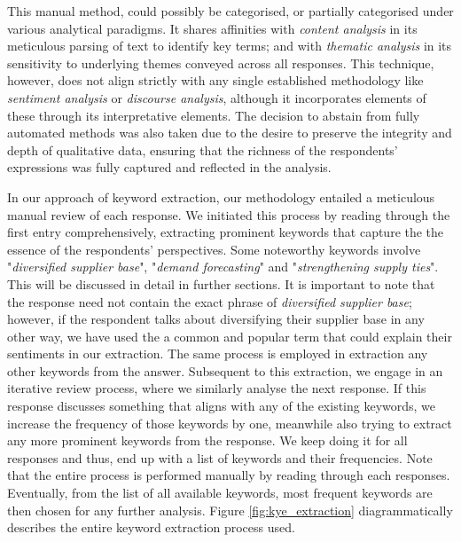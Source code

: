 This manual method, could possibly be categorised, or partially categorised under various analytical paradigms. It shares affinities with \textit{content analysis} in its meticulous parsing of text to identify key terms; and with \textit{thematic analysis} in its sensitivity to underlying themes conveyed across all responses. This technique, however, does not align strictly with any single established methodology like \textit{sentiment analysis} or \textit{discourse analysis}, although it incorporates elements of these through its interpretative elements. The decision to abstain from fully automated methods was also taken due to the desire to preserve the integrity and depth of qualitative data, ensuring that the richness of the respondents' expressions was fully captured and reflected in the analysis. 

In our approach of keyword extraction, our methodology entailed a meticulous manual review of each response. We initiated this process by reading through the first entry comprehensively, extracting prominent keywords that capture the the essence of the respondents' perspectives. Some noteworthy keywords involve "\textit{diversified supplier base}", "\textit{demand forecasting}" and "\textit{strengthening supply ties}". This will be discussed in detail in further sections. It is important to note that the response need not contain the exact phrase of \textit{diversified supplier base}; however, if the respondent talks about diversifying their supplier base in any other way, we have used the a common and popular term that could explain their sentiments in our extraction. The same process is employed in extraction any other keywords from the answer. Subsequent to this extraction, we engage in an iterative review process, where we similarly analyse the next response. If this response discusses something that aligns with any of the existing keywords, we increase the frequency of those keywords by one, meanwhile also trying to extract any more prominent keywords from the response. We keep doing it for all \participantCount{} responses and thus, end up with a list of keywords and their frequencies. Note that the entire process is performed manually by reading through each responses. Eventually, from the list of all available keywords, most frequent keywords are then chosen for any further analysis. Figure \ref{fig:kye_extraction} diagrammatically describes the entire keyword extraction process used.

